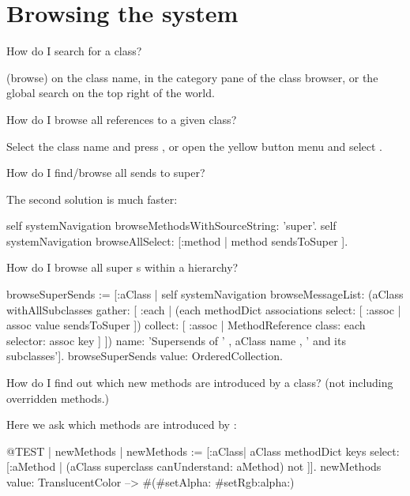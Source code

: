 \documentclass[a4paper,10pt,twoside]{book}
\begin{document}
\section{Browsing the system}

\begin{faq}
How do I search for a class?
\end{faq}
\answer
{} (browse) on the class name,  in the category pane of the class browser, or the global search on the top right of the world.

\begin{faq}
How do I browse all references to a given class?
\end{faq}
\answer
Select the class name and press , or open the yellow button menu and select .

\begin{faq}
How do I find/browse all sends to super?
\end{faq}
\answer
The second solution is much faster:
\begin{code}{}
self systemNavigation browseMethodsWithSourceString: 'super'.
self systemNavigation browseAllSelect: [:method | method sendsToSuper ].
\end{code}

\begin{faq}
How do I browse all super s within a hierarchy?
\end{faq}
\answer
\begin{code}{}
browseSuperSends := [:aClass | self systemNavigation
	browseMessageList: (aClass withAllSubclasses gather: [ :each |
		(each methodDict associations
			select: [ :assoc | assoc value sendsToSuper ])
				collect: [ :assoc | MethodReference class: each selector: assoc key ] ])
	name: 'Supersends of ' , aClass name , ' and its subclasses'].
browseSuperSends value: OrderedCollection.
\end{code}

\begin{faq}
How do I find out which new methods are introduced by a class?
(\ie not including overridden methods.)
\end{faq}
\answer
Here we ask which methods are introduced by :
\begin{code}{@TEST | newMethods |}
newMethods := [:aClass| aClass methodDict keys select:
	[:aMethod | (aClass superclass canUnderstand: aMethod) not ]].
newMethods value: TranslucentColor --> #(#setAlpha: #setRgb:alpha:)
\end{code}
\end{document}
